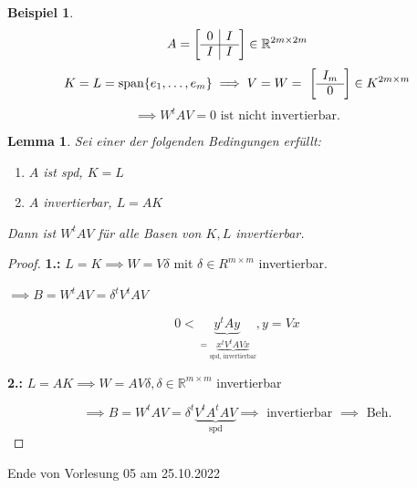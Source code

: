 \documentclass{book}
\newtheorem{lemma}[algorithm]{Lemma}
\newtheorem{example}[algorithm]{Beispiel}
\def\R{\mathbb{R}}
\begin{document}
            \begin{example}\label{b3.3}
                \[
                    A=\left[
                        \begin{array}{c|c}
                            0 & I\\\cline{1-2}
                            I & I
                        \end{array}
                    \right]\in\R^{2m\times 2m}
                \]
                \[
                    K=L=\text{span}\{e_1,\dots,e_m\}\implies V=W=\
                    \left[
                        \begin{array}{c}
                            I_m\\\cline{1-1}
                            0
                        \end{array}
                    \right]\in K^{2m\times m}
                \]
                \[\implies W^t A V =0 \text{ ist nicht invertierbar.}\]
            \end{example}

            \begin{lemma}\label{3.4}
                Sei einer der folgenden Bedingungen erfüllt:
                \begin{enumerate}
                    \item $A$ ist spd, $K=L$
                    \item $A$ invertierbar, $L=AK$
                \end{enumerate}
                Dann ist $W^tAV$ für alle Basen von $K,L$ invertierbar.
            \end{lemma}

            \begin{proof}
                \textbf{1.:} $L=K\implies W=V\delta$ mit $\delta \in R^{m\times m}$ invertierbar.

                $\implies B=W^tAV=\delta^tV^tAV$ %

                \[0<\underbrace{y^tAy}_{=\underbrace{x^tV^t A V x}_{\text{spd, invertierbar}}},y=Vx\]

                \textbf{2.:} $L=AK \implies W=AV\delta,\delta\in\R^{m\times m}$ invertierbar

                \[\implies B=W^tAV=\delta^t\underbrace{V^tA^tAV}_{\text{spd}} \implies\text{ invertierbar } \implies \text{ Beh.}\]
            \end{proof}

            \noindent
            \xrfill[0.7ex]{1pt}Ende von Vorlesung 05 am 25.10.2022\xrfill[0.7ex]{1pt}
\end{document}
